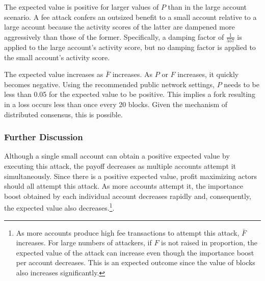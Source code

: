The expected value is positive for larger values of $P$ than in the large account scenario.
A fee attack confers an outsized benefit to a small account relative to a large account because the activity scores of the latter are dampened more aggressively than those of the former.
Specifically, a damping factor of $\frac{1}{557}$ is applied to the large account's activity score, but no damping factor is applied to the small account's activity score.

The expected value increases as $\bar{F}$ increases.
As $P$ or $F$ increases, it quickly becomes negative.
Using the recommended public network settings, $P$ needs to be less than 0.05 for the expected value to be positive.
This implies a fork resulting in a loss occurs less than once every 20 blocks.
Given the mechanism of distributed consensus, this is possible.

\begin{figure}[H]
\end{figure}

\subsubsection*{Further Discussion}

Although a single small account can obtain a positive expected value by executing this attack, the payoff decreases as multiple accounts attempt it simultaneously.
Since there is a positive expected value, profit maximizing actors should all attempt this attack.
As more accounts attempt it, the importance boost obtained by each individual account decreases rapidly and, consequently, the expected value also decreases.\footnote{
	As more accounts produce high fee transactions to attempt this attack, $\bar{F}$ increases.
	For large numbers of attackers, if $F$ is not raised in proportion, the expected value of the attack can increase even though the importance boost per account decreases.
	This is an expected outcome since the value of blocks also increases significantly.
}.

